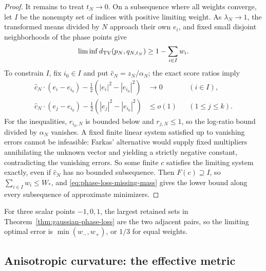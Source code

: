 \begin{proof}
It remains to treat $t_N\to0$. On a subsequence where all weights
converge, let $I$ be the nonempty set of indices with positive
limiting weight. As $\lambda_N\to1$, the transformed means divided by $N$
approach their own $e_i$, and fixed small disjoint neighborhoods of
the phase points give
\begin{equation}
 \liminf d_{\mathrm{TV}}(p_N,q_{N,t_N})\ge1-\sum_{i\in I}w_i.
 \label{eq:phase-loss-missing-mass}
\end{equation}
To constrain $I$, fix $i_0\in I$ and put $\hat c_N=z_N/\alpha_N$;
the exact score ratios imply
\begin{align*}
 \hat c_N\cdot(e_i-e_{i_0})
       -\tfrac12(|e_i|^2-|e_{i_0}|^2)&\to0&& (i\in I),\\
 \hat c_N\cdot(e_j-e_{i_0})
       -\tfrac12(|e_j|^2-|e_{i_0}|^2)&\le o(1)&& (1\le j\le k).
\end{align*}
For the inequalities, $r_{i_0,N}$ is bounded below and
$r_{j,N}\le1$, so the log-ratio bound divided by $\alpha_N$ vanishes.
A fixed finite linear system satisfied up to vanishing errors cannot
be infeasible: Farkas' alternative would supply fixed multipliers
annihilating the unknown vector and yielding a strictly negative
constant, contradicting the vanishing errors. So some finite $c$
satisfies the limiting system exactly, even if $\hat c_N$ has no
bounded subsequence. Then $F(c)\supseteq I$, so
$\sum_{i\in I}w_i\le W_*$, and \eqref{eq:phase-loss-missing-mass}
gives the lower bound along every subsequence of approximate
minimizers.
\end{proof}

For three scalar points $-1,0,1$, the largest retained sets in
Theorem~\ref{thm:gaussian-phase-loss} are the two adjacent pairs, so
the limiting optimal error is $\min(w_-,w_+)$, or $1/3$ for equal
weights.

\subsection{Anisotropic curvature: the effective metric}

